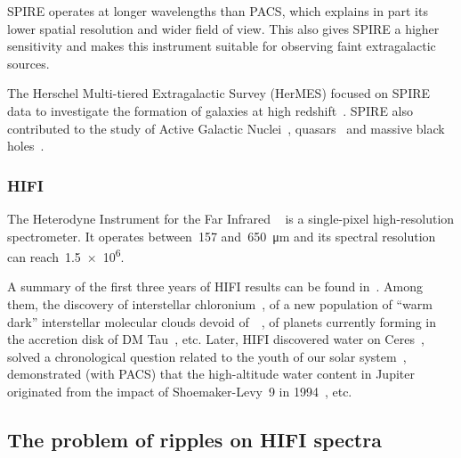 SPIRE operates at longer wavelengths than PACS, which explains in part its lower spatial resolution and wider field of view.
This also gives SPIRE a higher sensitivity and makes this instrument suitable for observing faint extragalactic sources.

The Herschel Multi-tiered Extragalactic Survey (HerMES) focused on SPIRE data to investigate the formation of galaxies at high redshift~\autocite{oliver2012herschel}.
SPIRE also contributed to the study of Active Galactic Nuclei~\autocite{hatziminaoglou2010hermes}, quasars~\autocite{bonfield2011herschel} and massive black holes~\autocite{van2010black}.

\subsubsection{HIFI}
The Heterodyne Instrument for the Far Infrared%
~\autocite{AA_537_A17}
is a single-pixel high-resolution spectrometer.
It operates between~\num{157} and~\SI{650}{\micro\meter} and its spectral resolution can reach~\num{1.5e6}.

A summary of the first three years of HIFI results can be found in~\textcite{vandertak2012first}.
Among them,
the discovery of interstellar chloronium~\autocite{lis2010herschel},
of a new population of ``warm dark'' interstellar molecular clouds devoid of~~\autocite{langer2010c+},
of planets currently forming in the accretion disk of DM Tau~\autocite{bergin2010sensitive}, etc.
Later, HIFI discovered water on Ceres~\autocite{kuppers2014localized},
solved a chronological question related to the youth of our solar system~\autocite{ceccarelli2014herschel},
demonstrated (with PACS) that the high-altitude water content in Jupiter originated from the impact of Shoemaker-Levy~9 in 1994~\autocite{cavalie2013spatial}, etc.


\subsection{The problem of ripples on HIFI spectra}

